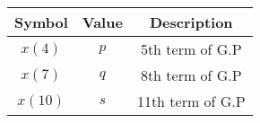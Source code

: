   \begin{tabular}{|c|c|c|}
    \hline
            \textbf{Symbol} & \textbf{Value} & \textbf{Description} \\
    \hline
          $x(4)$ & $p$ & 5th term of G.P \\
    \hline
	  $x(7)$ & $q$ & 8th term of G.P\\
    \hline 
	  $x({10})$ &$s$ &11th term of G.P \\
    \hline
  \end{tabular}

